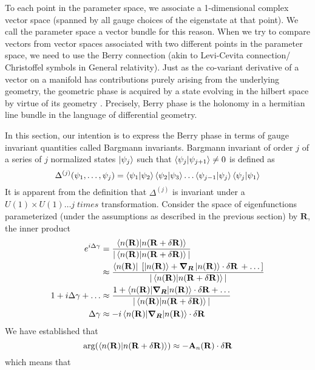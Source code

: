 To each point in the parameter space, we associate a 1-dimensional complex vector space (spanned by all gauge choices of the eigenstate at that point). We call the parameter space a vector bundle for this reason.
When we try to compare vectors from vector spaces associated with two different points in the parameter space, we need to use the Berry connection (akin to Levi-Cevita connection/
Christoffel symbols in General relativity). Just as the co-variant derivative of a vector on a manifold has contributions purely arising from the underlying 
geometry, the geometric phase is acquired by a state evolving in the hilbert space by virtue of its geometry \cite{simon1983holonomy}. 
Precisely, Berry phase is the holonomy in a hermitian line bundle in the language of differential geometry.

In this section, our intention is to express the Berry phase in terms of gauge invariant quantities called Bargmann invariants. 
Bargmann invariant of order $j$ of a series of $j$ normalized states $\ket{\psi_j}$ such that $\braket{\psi_j|\psi_{j+1}} \neq 0$ is defined as 
\begin{equation}
 \Delta^{(j)}(\psi_1, \dots, \psi_j) = \braket{\psi_1 | \psi_2}\braket{\psi_2|\psi_3}\dots\braket{\psi_{j-1}|\psi_j}\braket{\psi_j|\psi_1}
\end{equation} It is apparent from the definition that $\Delta^{(j)}$ is invariant under a $U(1) \times U(1) \dots j\;times$ transformation.
Consider the space of eigenfunctions parameterized (under the assumptions as 
described in the previous section) by $\mathbf{R}$, the inner product 
\begin{align}
e^{i\Delta\gamma} &= \frac{\braket{n(\mathbf{R})|n(\mathbf{R} +\delta\mathbf{R})}}{|\braket{n(\mathbf{R})|n(\mathbf{R} +\delta\mathbf{R})}|} \\
 		  &\approx \frac{\bra{n(\mathbf{R})}\;\lbrack \ket{n(\mathbf{R})} + \bm{\nabla_R}\ket{n(\mathbf{R})}\cdot \delta\mathbf{R}\, + \dots \rbrack}{|\braket{n(\mathbf{R})|n(\mathbf{R} +\delta\mathbf{R})}|} \nonumber \\
1 + i\Delta\gamma + \dots &\approx \frac{1 + \braket{n(\mathbf{R})|\bm{\nabla_R}|n(\mathbf{R})}\cdot \delta\mathbf{R} + \dots}{|\braket{n(\mathbf{R})|n(\mathbf{R} +\delta\mathbf{R})}|} \nonumber \\
\Delta\gamma	   &\approx  -i\braket{n(\mathbf{R})|\bm{\nabla_R}|n(\mathbf{R})}\cdot \delta\mathbf{R}
\end{align}
We have established that 
\begin{equation*}
 \arg(\braket{n(\mathbf{R})|n(\mathbf{R} +\delta\mathbf{R})}) \approx -\mathbf{A}_{n}(\mathbf{R}) \cdot \delta\mathbf{R}
\end{equation*} which means that
